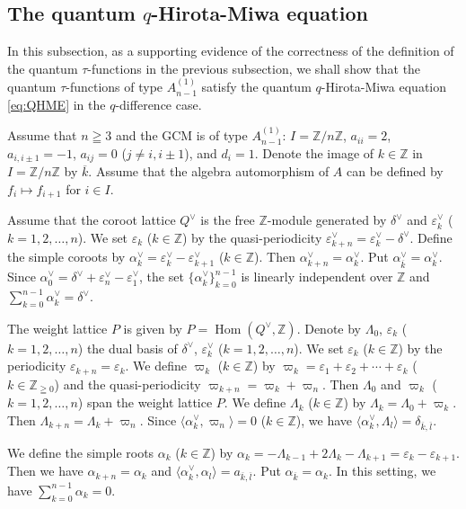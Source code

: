 \documentclass[12pt,twoside]{article}
\newcommand\bra{\langle}
\newcommand\ket{\rangle}
\newcommand\Hom{\mathop{\mathrm{Hom}}\nolimits}
\newcommand\av{\alpha^\vee}
\newcommand\eps{\varepsilon}
\newcommand\epsv{\eps^\vee}
\newcommand\deltav{\delta^\vee}
\newcommand\Qv{Q^\vee}
\newcommand\Z{{\mathbb Z}} %
\theoremstyle{plain} %
\theoremstyle{definition} %
\theoremstyle{definition} %
\numberwithin{theorem}{section}
\numberwithin{equation}{section}
\numberwithin{figure}{section}
\numberwithin{table}{section}
\begin{document}

\subsection{The quantum $q$-Hirota-Miwa equation}
\label{sec:QHME}

In this subsection, as a supporting evidence of the correctness of
the definition of the quantum $\tau$-functions in the previous subsection, 
we shall show that the quantum $\tau$-functions of type $A^{(1)}_{n-1}$ satisfy
the quantum $q$-Hirota-Miwa equation \eqref{eq:QHME} in the $q$-difference case.

Assume that $n\geqq 3$ and the GCM is of type $A^{(1)}_{n-1}$:
$I=\Z/n\Z$, $a_{ii}=2$, $a_{i,i\pm1}=-1$, $a_{ij}=0$ ($j\ne i,i\pm1$),
and $d_i=1$.
Denote the image of $k\in\Z$ in $I=\Z/n\Z$ by $\overline{k}$.
Assume that the algebra automorphism of $A$ can be defined by 
$f_i\mapsto f_{i+1}$ for $i\in I$.

Assume that the coroot lattice $\Qv$ is the free $\Z$-module generated 
by $\deltav$ and $\epsv_k$ ($k=1,2,\ldots,n$).
We set $\eps_k$ ($k\in\Z$) by the quasi-periodicity $\epsv_{k+n}=\epsv_k-\deltav$.
Define the simple coroots by $\av_k=\epsv_k-\epsv_{k+1}$ ($k\in\Z$). 
Then $\av_{k+n}=\av_k$. Put $\av_{\overline{k}}=\av_k$. 
Since $\av_0=\deltav+\epsv_n-\epsv_1$, 
the set $\{\av_k\}_{k=0}^{n-1}$ is linearly independent over $\Z$
and $\sum_{k=0}^{n-1}\av_k=\deltav$.

The weight lattice $P$ is given by $P=\Hom(\Qv,\Z)$.
Denote by $\Lambda_0$, $\eps_k$ ($k=1,2,\ldots,n$)
the dual basis of $\deltav$, $\epsv_k$ ($k=1,2,\dots,n$).
We set $\eps_k$ ($k\in\Z$) by the periodicity $\eps_{k+n}=\eps_k$.
We define $\varpi_k$ ($k\in\Z$) by
$\varpi_k=\eps_1+\eps_2+\cdots+\eps_k$ ($k\in\Z_{\geqq0}$)
and the quasi-periodicity $\varpi_{k+n}=\varpi_k+\varpi_n$.
Then $\Lambda_0$ and $\varpi_k$ ($k=1,2,\ldots,n$) span the weight lattice $P$.
We define $\Lambda_k$ ($k\in\Z$) by
$\Lambda_k=\Lambda_0+\varpi_k$.
Then $\Lambda_{k+n}=\Lambda_k+\varpi_n$.
Since $\bra\av_k,\varpi_n\ket=0$ ($k\in\Z$), 
we have $\bra\av_k,\Lambda_l\ket=\delta_{\overline{k},\overline{l}}$.

We define the simple roots $\alpha_k$ ($k\in\Z$) by \(
 \alpha_k
 =-\Lambda_{k-1}+2\Lambda_k-\Lambda_{k+1}
 = \eps_k-\eps_{k+1}
\). Then we have $\alpha_{k+n}=\alpha_k$
and $\bra\av_k,\alpha_l\ket=a_{\overline{k},\overline{l}}$. 
Put $\alpha_{\overline{k}}=\alpha_k$.
In this setting, we have $\sum_{k=0}^{n-1}\alpha_k=0$.
\end{document}
